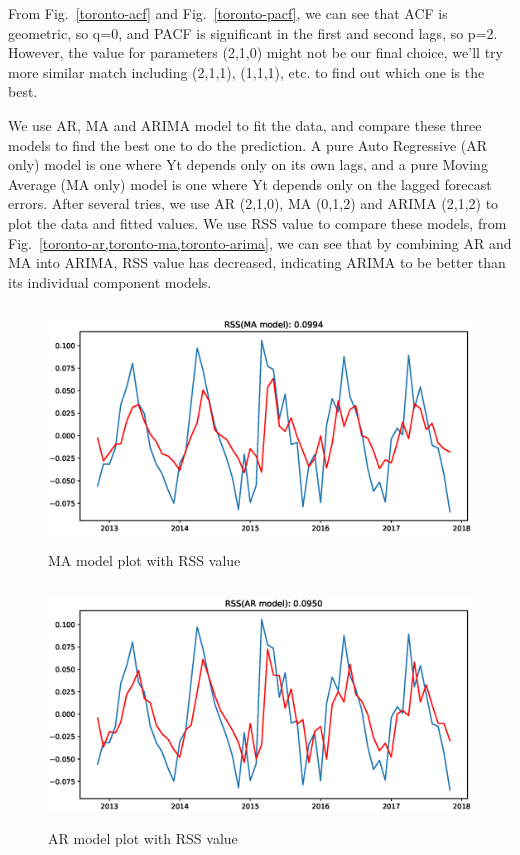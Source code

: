 \documentclass[runningheads]{llncs}
\begin{document}
From Fig.~\ref{toronto-acf} and Fig.~\ref{toronto-pacf}, we can see that ACF is geometric, so q=0, and PACF is significant in the first and second lags, so p=2. However, the value for parameters (2,1,0) might not be our final choice, we’ll try more similar match including (2,1,1), (1,1,1), etc. to find out which one is the best.

We use AR, MA and ARIMA model to fit the data, and compare these three models to find the best one to do the prediction. A pure Auto Regressive (AR only) model is one where Yt depends only on its own lags, and a pure Moving Average (MA only) model is one where Yt depends only on the lagged forecast errors. After several tries, we use AR (2,1,0), MA (0,1,2) and ARIMA (2,1,2) to plot the data and fitted values. We use RSS value to compare these models, from Fig.~\ref{toronto-ar,toronto-ma,toronto-arima}, we can see that by combining AR and MA into ARIMA, RSS value has decreased, indicating ARIMA to be better than its individual component models.

\begin{figure}
    \centering
    \includegraphics[height=2.5in]{Toronto-MAmodel.eps}
    \caption{MA model plot with RSS value}\label{toronto-ma}
\end{figure}

\begin{figure}
    \centering
    \includegraphics[height=2.5in]{Toronto-ARmodel.eps}
    \caption{AR model plot with RSS value}\label{toronto-ar}
\end{figure}
\end{document}
